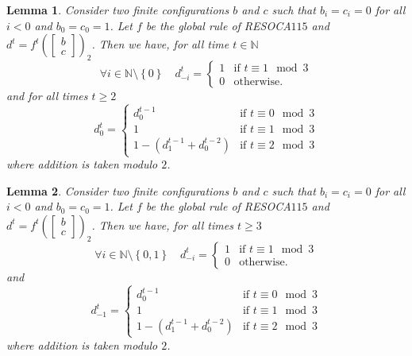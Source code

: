 \documentclass[submission,copyright,creativecommons]{eptcs}
\newcommand{\set}[1]{\ensuremath{\left\{#1\right\}}\xspace}
\newcommand{\N}{\ensuremath{\mathbb{N}}\xspace}
\newcommand{\cvres}[2]{\ensuremath{\begin{bmatrix}#1\\#2\end{bmatrix}}\xspace}
\newcommand{\RESOCA}{RESOCA\xspace}
\newtheorem{lemma}{Lemma}
\begin{document}
\begin{lemma}
\label{lem:periodicity-3}
 Consider two finite configurations $b$ and $c$ such that $b_i=c_i=0$ for all $i<0$ and $b_0=c_0=1$. Let $f$ be the global rule of \RESOCA $115$ and $d^t=f^t\left(\cvres{b}{c}\right)_2$. Then we have, for all time $t\in\N$
 \[
 \forall i\in\N\setminus\set{0}\quad d^t_{-i}=
 \begin{cases}
 1&\text{if\ }t\equiv1\mod3\\
 0&\text{otherwise.}
 \end{cases}
 \]
 and for all times $t\geq2$
 \[
 d^t_0= \begin{cases}
 d^{t-1}_0&\text{if\ }t\equiv0\mod3\\
 1&\text{if\ }t\equiv1\mod3\\
 1-(d^{t-1}_1+d^{t-2}_0)&\text{if\ }t\equiv2\mod3
 \end{cases}
 \]
 where addition is taken modulo $2$.
\end{lemma}
%
\begin{lemma}
\label{lem:periodicity-4}
  Consider two finite configurations $b$ and $c$ such that $b_i=c_i=0$ for all $i<0$ and $b_0=c_0=1$. Let $f$ be the global rule of \RESOCA $115$ and $d^t=f^t\left(\cvres{b}{c}\right)_2$. Then we have, for all times $t\geq3$
 \[
 \forall i\in\N\setminus\set{0,1}\quad d^t_{-i}=
 \begin{cases}
 1&\text{if\ }t\equiv1\mod3\\
 0&\text{otherwise.}
 \end{cases}
 \]
 and
 \[
 d^t_{-1}= \begin{cases}
 d^{t-1}_0&\text{if\ }t\equiv0\mod3\\
 1&\text{if\ }t\equiv1\mod3\\
 1-(d^{t-1}_1+d^{t-2}_0)&\text{if\ }t\equiv2\mod3
 \end{cases}
 \]
 where addition is taken modulo $2$.
\end{lemma}
%
\end{document}
